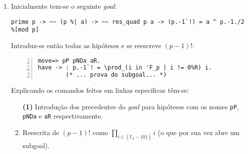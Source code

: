 \begin{enumerate}[label=\textbf{\roman*.}]


        \item Inicialmente tem-se o seguinte \textit{goal}:
        \begin{lstlisting}[language=coq,frame=single,tabsize=1]
prime p -> ~~ (p %| a) -> ~~ res_quad p a -> (p.-1`!) = a ^ p.-1./2 %[mod p]
        \end{lstlisting}
        Introduz-se então todas as hipóteses e se reescreve $(p-1)!$:
        \begin{lstlisting}[language=coq,frame=single, numbers=left,stepnumber=1,tabsize=1]
move=> pP pNDa aR.
have -> : p.-1`! = \prod_(i in 'F_p | i != 0%R) i.
        (* ... prova do subgoal... *)
        \end{lstlisting}
        Explicando os comandos feitos em linhas específicas têm-se:
        \begin{enumerate}
                \item[\textbf{(1)}] Introdução dos precedentes do \textit{goal} para hipóteses com os nomes \lstinline[language=coq]|pP|, \lstinline[language=coq]|pNDa| e \lstinline[language=coq]|aR| respectivamente.
                
                \item[\textbf{(2)}] Reescrita de $(p-1)!$ como $\prod_{i \in (\mathbb{F}_p - \{0\})} i$ (o que por sua vez abre um subgoal).
                
        \end{enumerate}



\end{enumerate}
